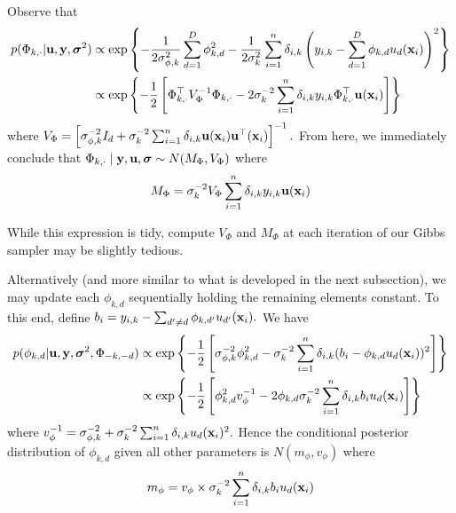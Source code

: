 \documentclass[12pt]{article}
\begin{document}
Observe that
\begin{align*}
p(\Phi_{k,\cdot} | \bu, \by, \bsigma^{2}) &\propto \exp\left\{-\frac{1}{2\sigma^{2}_{\phi,k}}\sum_{d = 1}^{D}{\phi_{k,d}^{2}} - \frac{1}{2\sigma^{2}_{k}}\sum_{i = 1}^{n}{\delta_{i,k}\left(y_{i,k} - \sum_{d = 1}^{D}{\phi_{k,d}u_{d}(\bx_{i})}\right)^{2}}\right\}  \\
&\propto \exp\left\{-\frac{1}{2}\left[\Phi_{k,\cdot}^{\top}V_{\Phi}^{-1}\Phi_{k,\cdot} - 2\sigma^{-2}_{k}\sum_{i = 1}^{n}{\delta_{i,k}y_{i,k}\Phi_{k,\cdot}^{\top}\bu(\bx_{i})} \right]\right\}%
\end{align*}
where $V_{\Phi} = \left[\sigma^{-2}_{\phi,k}I_{d} + \sigma^{-2}_{k}\sum_{i = 1}^{n}{\delta_{i,k}\mathbf{u}(\mathbf{x}_{i})\mathbf{u}^{\top}(\mathbf{x}_{i})}\right]^{-1}.$
From here, we immediately conclude that $\Phi_{k,\cdot} \mid \mathbf{y}, \mathbf{u}, \boldsymbol{\sigma} \sim N(M_{\Phi}, V_{\Phi})$ where
$$
M_{\Phi} = \sigma^{-2}_{k}V_{\Phi}\sum_{i = 1}^{n}{\delta_{i,k}y_{i,k}\mathbf{u}(\mathbf{x}_{i})}
$$

While this expression is tidy, compute $V_{\Phi}$ and $M_{\Phi}$ at each iteration of our Gibbs sampler may be slightly tedious.

Alternatively (and more similar to what is developed in the next subsection), we may update each $\phi_{k,d}$ sequentially holding the remaining elements constant.
To this end, define $b_{i} = y_{i,k} - \sum_{d' \neq d}{\phi_{k,d'}u_{d'}(\mathbf{x}_{i})}.$
We have
\begin{align*}
p(\phi_{k,d} | \mathbf{u}, \mathbf{y}, \boldsymbol{\sigma}^{2}, \Phi_{-k,-d}) &\propto \exp\left\{-\frac{1}{2}\left[\sigma_{\phi,k}^{-2}\phi_{k,d}^{2} - \sigma^{-2}_{k}\sum_{i = 1}^{n}{\delta_{i,k}(b_{i} - \phi_{k,d}u_{d}(\mathbf{x}_{i}))^{2}}\right]\right\}\\
&\propto \exp\left\{-\frac{1}{2}\left[ \phi_{k,d}^{2}v_{\phi}^{-1} - 2\phi_{k,d}\sigma^{-2}_{k}\sum_{i = 1}^{n}{\delta_{i,k}b_{i}u_{d}(\mathbf{x}_{i})}\right]\right\}
\end{align*}
where $v_{\phi}^{-1} = \sigma^{-2}_{\phi,k} + \sigma^{-2}_{k}\sum_{i = 1}^{n}{\delta_{i,k}u_{d}(\mathbf{x}_{i})^{2}}.$ 
Hence the conditional posterior distribution of $\phi_{k,d}$ given all other parameters is $N(m_{\phi},v_{\phi})$ where
$$
m_{\phi} = v_{\phi} \times \sigma^{-2}_{k}\sum_{i = 1}^{n}{\delta_{i,k}b_{i}u_{d}(\mathbf{x}_{i})}
$$
\end{document}
